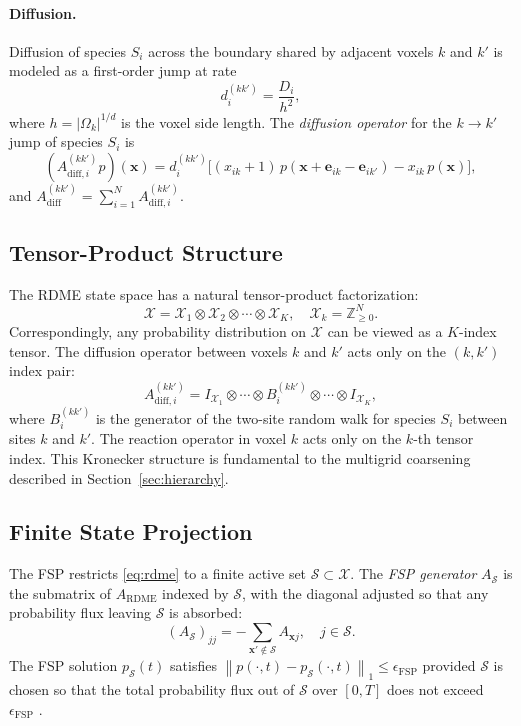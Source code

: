 \documentclass[review,onefignum,onetabnum]{siamart171218}
\newcommand{\bx}{\mathbf{x}}
\newcommand{\Znn}{\mathbb{Z}_{\geq 0}}
\newcommand{\calX}{\mathcal{X}}
\newcommand{\calS}{\mathcal{S}}
\newcommand{\norm}[1]{\left\|#1\right\|}
\begin{document}
\paragraph{Diffusion.}
Diffusion of species $S_i$ across the boundary shared by adjacent
voxels $k$ and $k'$ is modeled as a first-order jump at rate
\begin{equation}
  \label{eq:diff-rate}
  d_i^{(kk')} = \frac{D_i}{h^2},
\end{equation}
where $h = |\Omega_k|^{1/d}$ is the voxel side length.  The
\emph{diffusion operator} for the $k \to k'$ jump of species $S_i$
is
\begin{equation}
  \label{eq:diff-op}
  (A_{\mathrm{diff},i}^{(kk')} p)(\bx)
  = d_i^{(kk')}
    \bigl[
      (x_{ik}+1)\, p(\bx + \mathbf{e}_{ik} - \mathbf{e}_{ik'})
      - x_{ik}\, p(\bx)
    \bigr],
\end{equation}
and $A_{\mathrm{diff}}^{(kk')} = \sum_{i=1}^{N} A_{\mathrm{diff},i}^{(kk')}$.

\subsection{Tensor-Product Structure}
\label{sec:tensor}

The RDME state space has a natural tensor-product factorization:
\begin{equation}
  \label{eq:tensor-decomp}
  \calX = \calX_1 \otimes \calX_2 \otimes \cdots \otimes \calX_K,
  \quad \calX_k = \Znn^N.
\end{equation}
Correspondingly, any probability distribution on $\calX$ can be
viewed as a $K$-index tensor.  The diffusion operator between
voxels $k$ and $k'$ acts only on the $(k, k')$ index pair:
\begin{equation}
  A_{\mathrm{diff},i}^{(kk')}
  = I_{\calX_1} \otimes \cdots \otimes B_i^{(kk')} \otimes \cdots
    \otimes I_{\calX_K},
\end{equation}
where $B_i^{(kk')}$ is the generator of the two-site random walk
for species $S_i$ between sites $k$ and $k'$.  The reaction
operator in voxel $k$ acts only on the $k$-th tensor index.  This
Kronecker structure is fundamental to the multigrid coarsening
described in Section~\ref{sec:hierarchy}.

\subsection{Finite State Projection}

The FSP \cite{Munsky2006} restricts \eqref{eq:rdme} to a finite
active set $\calS \subset \calX$.  The \emph{FSP generator}
$A_{\calS}$ is the submatrix of $A_{\mathrm{RDME}}$ indexed by
$\calS$, with the diagonal adjusted so that any probability flux
leaving $\calS$ is absorbed:
\begin{equation}
  (A_{\calS})_{jj} = -\sum_{\bx' \notin \calS} A_{\bx j},
  \quad j \in \calS.
\end{equation}
The FSP solution $p_{\calS}(t)$ satisfies
$\norm{p(\cdot,t) - p_{\calS}(\cdot,t)}_1 \leq \epsilon_{\mathrm{FSP}}$
provided $\calS$ is chosen so that the total probability flux
out of $\calS$ over $[0,T]$ does not exceed $\epsilon_{\mathrm{FSP}}$
\cite{Munsky2006}.
\end{document}
